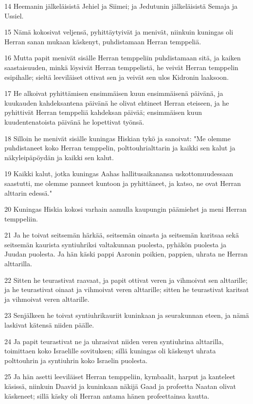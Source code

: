 \par 14 Heemanin jälkeläisistä Jehiel ja Siimei; ja Jedutunin jälkeläisistä Semaja ja Ussiel.
\par 15 Nämä kokosivat veljensä, pyhittäytyivät ja menivät, niinkuin kuningas oli Herran sanan mukaan käskenyt, puhdistamaan Herran temppeliä.
\par 16 Mutta papit menivät sisälle Herran temppeliin puhdistamaan sitä, ja kaiken saastaisuuden, minkä löysivät Herran temppelistä, he veivät Herran temppelin esipihalle; sieltä leeviläiset ottivat sen ja veivät sen ulos Kidronin laaksoon.
\par 17 He alkoivat pyhittämisen ensimmäisen kuun ensimmäisenä päivänä, ja kuukauden kahdeksantena päivänä he olivat ehtineet Herran eteiseen, ja he pyhittivät Herran temppeliä kahdeksan päivää; ensimmäisen kuun kuudentenatoista päivänä he lopettivat työnsä.
\par 18 Silloin he menivät sisälle kuningas Hiskian tykö ja sanoivat: "Me olemme puhdistaneet koko Herran temppelin, polttouhrialttarin ja kaikki sen kalut ja näkyleipäpöydän ja kaikki sen kalut.
\par 19 Kaikki kalut, jotka kuningas Aahas hallitusaikanansa uskottomuudessaan saastutti, me olemme panneet kuntoon ja pyhittäneet, ja katso, ne ovat Herran alttarin edessä."
\par 20 Kuningas Hiskia kokosi varhain aamulla kaupungin päämiehet ja meni Herran temppeliin.
\par 21 Ja he toivat seitsemän härkää, seitsemän oinasta ja seitsemän karitsaa sekä seitsemän kaurista syntiuhriksi valtakunnan puolesta, pyhäkön puolesta ja Juudan puolesta. Ja hän käski pappi Aaronin poikien, pappien, uhrata ne Herran alttarilla.
\par 22 Sitten he teurastivat raavaat, ja papit ottivat veren ja vihmoivat sen alttarille; ja he teurastivat oinaat ja vihmoivat veren alttarille; sitten he teurastivat karitsat ja vihmoivat veren alttarille.
\par 23 Senjälkeen he toivat syntiuhrikauriit kuninkaan ja seurakunnan eteen, ja nämä laskivat kätensä niiden päälle.
\par 24 Ja papit teurastivat ne ja uhrasivat niiden veren syntiuhrina alttarilla, toimittaen koko Israelille sovituksen; sillä kuningas oli käskenyt uhrata polttouhrin ja syntiuhrin koko Israelin puolesta.
\par 25 Ja hän asetti leeviläiset Herran temppeliin, kymbaalit, harput ja kanteleet käsissä, niinkuin Daavid ja kuninkaan näkijä Gaad ja profeetta Naatan olivat käskeneet; sillä käsky oli Herran antama hänen profeettainsa kautta.
